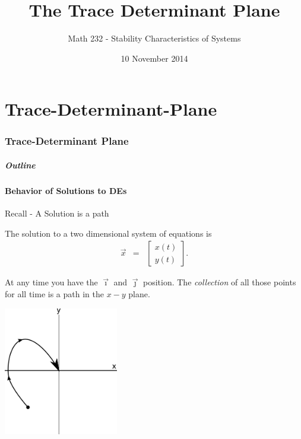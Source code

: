 \part{Trace-Determinant-Plane}
\section{Trace-Determinant Plane}


\title{The Trace Determinant Plane}
\subtitle{Math 232 - Stability Characteristics of Systems}
\date{10 November 2014}

\begin{frame}
  \titlepage
\end{frame}

\begin{frame}
  \frametitle{Outline}
  \tableofcontents[ currentsection ]
\end{frame}


\subsection{Behavior of Solutions to DEs}


\begin{frame}{Recall - A Solution is a path}

  The solution to a two dimensional system of equations is 
  \begin{eqnarray*}
    \vec{x} & = & \left[
      \begin{array}{r}
        x(t) \\ y(t)
      \end{array}
      \right].
  \end{eqnarray*}

  At any time you have the $\vec{\imath}$ and $\vec{\jmath}$
  position. The \textit{collection} of all those points for all time
  is a path in the $x-y$ plane.

  \vfill

  \centerline{\includegraphics[width=5cm]{img/oneSystemSolution}}

  \vfill
  
\end{frame}

